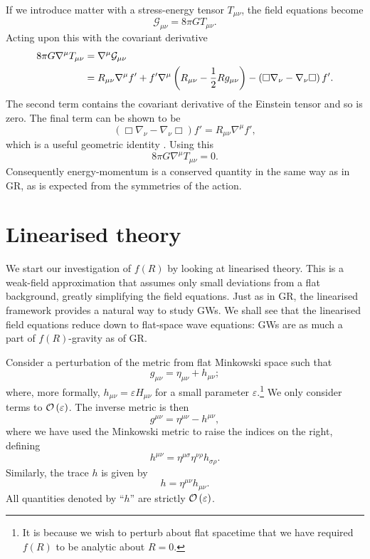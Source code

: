 If we introduce matter with a stress-energy tensor $T_{\mu\nu}$, the field equations become
\begin{equation}
\mathcal{G}_{\mu\nu} = 8\pi GT_{\mu\nu}.
\end{equation}
Acting upon this with the covariant derivative
\begin{align}
8\pi G\nabla^\mu T_{\mu\nu} = {} & \nabla^\mu\mathcal{G}_{\mu\nu} \nonumber \\*
 = {} & R_{\mu\nu}\nabla^\mu f' + f'\nabla^\mu\left(R_{\mu\nu} - \frac{1}{2}R g_{\mu\nu}\right) - \left(\Box\nabla_\nu - \nabla_\nu\Box\right)f'.
\end{align}
The second term contains the covariant derivative of the Einstein tensor and so is zero. The final term can be shown to be
\begin{equation}
\left(\Box\nabla_\nu - \nabla_\nu\Box\right)f' = R_{\mu\nu}\nabla^\mu f',
\end{equation}
which is a useful geometric identity \citep{Koivisto2006a}. Using this
\begin{equation}
8\pi G\nabla^\mu T_{\mu\nu} = 0.
\end{equation}
Consequently energy-momentum is a conserved quantity in the same way as in GR, as is expected from the symmetries of the action.

\section{Linearised theory}\label{sec:Lin}

We start our investigation of $f(R)$ by looking at linearised theory. This is a weak-field approximation that assumes only small deviations from a flat background, greatly simplifying the field equations. Just as in GR, the linearised framework provides a natural way to study GWs. We shall see that the linearised field equations reduce down to flat-space wave equations: GWs are as much a part of $f(R)$-gravity as of GR.

Consider a perturbation of the metric from flat Minkowski space such that
\begin{equation}
g_{\mu\nu} = \eta_{\mu\nu} + h_{\mu\nu};
\end{equation}
where, more formally, $h_{\mu\nu} = \varepsilon H_{\mu\nu}$ for a small parameter $\varepsilon$.\footnote{It is because we wish to perturb about flat spacetime that we have required $f(R)$ to be analytic about $R = 0$.} We only consider terms to $\mathcal{O}\left({\varepsilon}\right)$. The inverse metric is then
\begin{equation}
g^{\mu\nu} = \eta^{\mu\nu} - h^{\mu\nu},
\end{equation}
where we have used the Minkowski metric to raise the indices on the right, defining
\begin{equation}
h^{\mu\nu} = \eta^{\mu\sigma}\eta^{\nu\rho}h_{\sigma\rho}.
\end{equation}
Similarly, the trace $h$ is given by
\begin{equation}
h = \eta^{\mu\nu}h_{\mu\nu}.
\end{equation}
All quantities denoted by ``$h$'' are strictly $\mathcal{O}\left({\varepsilon}\right)$.

